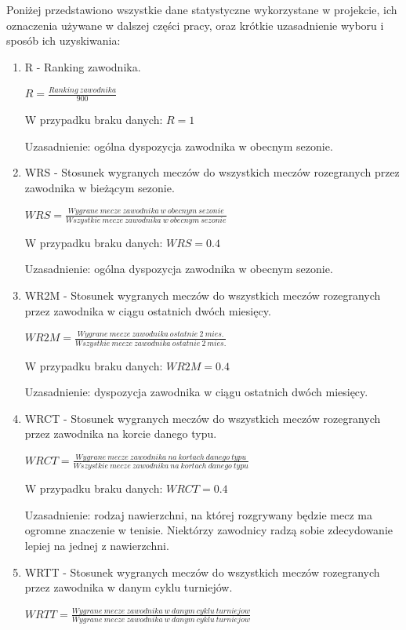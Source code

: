 Poniżej przedstawiono wszystkie dane statystyczne wykorzystane w projekcie, ich oznaczenia używane w dalszej części pracy, oraz krótkie uzasadnienie wyboru i sposób ich uzyskiwania:
\begin{enumerate}
\item R - Ranking zawodnika.

$R = \frac{Ranking\ zawodnika}{900}$

W przypadku braku danych: $R = 1$

Uzasadnienie: ogólna dyspozycja zawodnika w obecnym sezonie.

\item WRS - Stosunek wygranych meczów do wszystkich meczów rozegranych przez zawodnika w bieżącym sezonie.

$WRS = \frac{Wygrane\ mecze\ zawodnika\ w\ obecnym\ sezonie}{Wszystkie\ mecze\ zawodnika\ w\ obecnym\ sezonie}$

W przypadku braku danych: $WRS = 0.4$

Uzasadnienie: ogólna dyspozycja zawodnika w obecnym sezonie.

\item WR2M - Stosunek wygranych meczów do wszystkich meczów rozegranych przez zawodnika w ciągu ostatnich dwóch miesięcy.

$WR2M = \frac{Wygrane\ mecze\ zawodnika\ ostatnie\ 2\ mies.}{Wszystkie\ mecze\ zawodnika\ ostatnie\ 2\ mies.}$

W przypadku braku danych: $WR2M = 0.4$

Uzasadnienie: dyspozycja zawodnika w ciągu ostatnich dwóch miesięcy.

\item WRCT - Stosunek wygranych meczów do wszystkich meczów rozegranych przez zawodnika na korcie danego typu.

$WRCT = \frac{Wygrane\ mecze\ zawodnika\ na\ kortach\ danego\ typu}{Wszystkie\ mecze\ zawodnika\ na\ kortach\ danego\ typu}$

W przypadku braku danych: $WRCT = 0.4$

Uzasadnienie: rodzaj nawierzchni, na której rozgrywany będzie mecz ma ogromne znaczenie w tenisie. Niektórzy zawodnicy radzą sobie zdecydowanie lepiej na jednej z nawierzchni. 

\item WRTT - Stosunek wygranych meczów do wszystkich meczów rozegranych przez zawodnika w danym cyklu turniejów.

$WRTT = \frac{Wygrane\ mecze\ zawodnika\ w\ danym\ cyklu\ turniejow}{Wygrane\ mecze\ zawodnika\ w\ danym\ cyklu\ turniejow}$


\end{enumerate}

